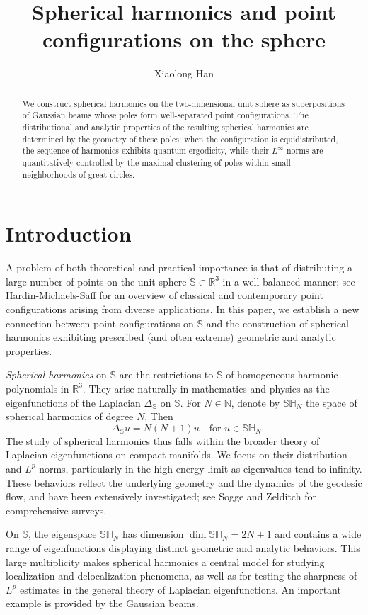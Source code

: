 \documentclass[12pt,reqno]{amsart}
\title{Spherical harmonics and point configurations on the sphere}
\author{Xiaolong Han}
\newcommand{\N}{\mathbb{N}}
\newcommand{\R}{\mathbb{R}}
\newcommand{\Sb}{\mathbb{S}}
\newcommand{\SH}{\mathbb{SH}}
\theoremstyle{plain}
\theoremstyle{definition}
\theoremstyle{remark}
\numberwithin{equation}{section}
\begin{document}
\maketitle


\begin{abstract}
We construct spherical harmonics on the two-dimensional unit sphere as superpositions of Gaussian beams whose poles form well-separated point configurations. The distributional and analytic properties of the resulting spherical harmonics are determined by the geometry of these poles: when the configuration is equidistributed, the sequence of harmonics exhibits quantum ergodicity, while their $L^\infty$ norms are quantitatively controlled by the maximal clustering of poles within small neighborhoods of great circles.
\end{abstract}


\section{Introduction}
A problem of both theoretical and practical importance is that of distributing a large number of points on the unit sphere $\Sb\subset\R^3$ in a well-balanced manner; see Hardin-Michaels-Saff \cite{HMS} for an overview of classical and contemporary point configurations arising from diverse applications. In this paper, we establish a new connection between point configurations on $\Sb$ and the construction of spherical harmonics exhibiting prescribed (and often extreme) geometric and analytic properties.

\textit{Spherical harmonics} on $\Sb$ are the restrictions to $\Sb$ of homogeneous harmonic polynomials in $\R^3$. They arise naturally in mathematics and physics as the eigenfunctions of the Laplacian $\Delta_\Sb$ on $\Sb$. For $N\in\N$, denote by $\SH_N$ the space of spherical harmonics of degree $N$. Then 
$$-\Delta_\Sb u=N(N+1)u\quad\text{for }u\in\SH_N.$$
The study of spherical harmonics thus falls within the broader theory of Laplacian eigenfunctions on compact manifolds. We focus on their distribution and $L^p$ norms, particularly in the high-energy limit as eigenvalues tend to infinity. These behaviors reflect the underlying geometry and the dynamics of the geodesic flow, and have been extensively investigated; see Sogge \cite{So} and Zelditch \cite{Ze3, Ze4} for comprehensive surveys.

On $\Sb$, the eigenspace $\SH_N$ has dimension $\dim\SH_N=2N+1$ and contains a wide range of eigenfunctions displaying distinct geometric and analytic behaviors. This large multiplicity makes spherical harmonics a central model for studying localization and delocalization phenomena, as well as for testing the sharpness of $L^p$ estimates in the general theory of Laplacian eigenfunctions. An important example is provided by the Gaussian beams.
\end{document}
